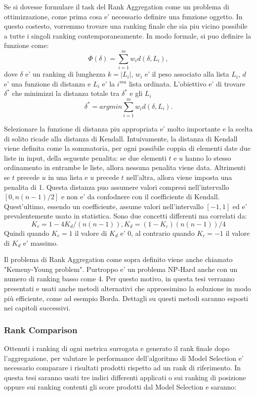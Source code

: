 Se si dovesse formulare il task del Rank Aggregation come un problema di ottimizzazione, come prima cosa e' necessario definire una funzione oggetto. In questo costesto, vorremmo trovare una ranking finale che sia piu vicino possibile a tutte i singoli ranking contemporaneamente. In modo formale, si puo definire la funzione come: \[ \Phi(\delta) = \sum_{i=1}^{m} w_id(\delta,L_i), \]	
dove $\delta$ e' un ranking di lunghezza $k=|L_i|$, $w_i$ e' il peso associato alla lista $L_i$, $d$ e' una funzione di distanza e $L_i$ e' la $i^{ma}$ lista ordinata.
L'obiettivo e' di trovare $\delta^*$ che minimizzi la distanza totale tra $\delta^*$ e gli $L_i$
\[ \delta^* = arg min \sum_{i=1}^{m} w_id(\delta,L_i). \]

Selezionare la funzione di distanza piu appropriata e' molto importante e la scelta di solito ricade alla distanza di Kendall.
Intuivamente, la distanza di Kendall viene definita come la sommatoria, per ogni possibile coppia di elementi date due liste in input, della seguente penalita:
se due elementi $t$ e $u$ hanno lo stesso ordinamento in entrambe le liste, allora nessuna penalita viene data. Altrimenti se $t$ precede $u$ in una lista e $u$ precede $t$ nell'altra, allora viene imposta una penalita di 1.
Questa distanza puo assumere valori compresi nell'intervallo $[0,n(n-1)/2]$ e non e' da confodnere con il coefficiente di Kendall. Quest'ultimo, essendo un coefficiente, assume valori nell'intervallo $[-1,1]$ ed e' prevalentemente usato in statistica. Sono due concetti differenti ma correlati da:
\[K_c=1-4K_d/(n(n-1)), K_d = (1-K_c)(n(n-1))/4\]
Quindi quando $K_c=1$ il valore di $K_d$ e' 0, al contrario quando $K_c=-1$ il valore di $K_d$ e' massimo.

Il problema di Rank Aggregation come sopra definito viene anche chiamato "Kemeny-Young problem". Purtroppo e' un problema NP-Hard anche con un numero di ranking basso come 4. Per questo motivo, in questa tesi verranno presentati e usati anche metodi alternativi che approssimino la soluzione in modo più efficiente, come ad esempio Borda. Dettagli su questi metodi saranno esposti nei capitoli successivi.

\subsubsection{Rank Comparison}
Ottenuti i ranking di ogni metrica surrogata e generato il rank finale dopo l'aggregazione, per valutare le performance dell'algoritmo di Model Selection e' necessario comparare i risultati prodotti rispetto ad un rank di riferimento.
In questa tesi saranno usati tre indici differenti applicati o sui ranking di posizione oppure sui ranking contenti gli score prodotti dal Model Selection e saranno:

